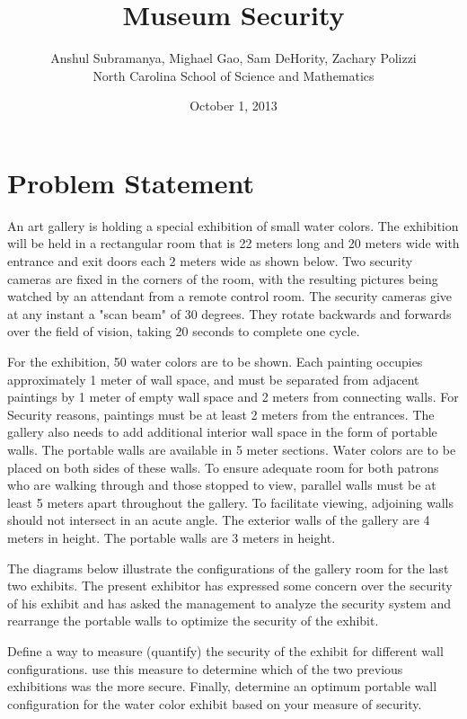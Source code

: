 \documentclass{article}
\title{Museum Security}
\author{Anshul Subramanya, Mighael Gao, Sam DeHority, Zachary Polizzi \\
North Carolina School of Science and Mathematics}
\date{October 1, 2013 }
\begin{document}
   \maketitle
   \begin{center}
      \end{center}
   \newpage
	   
	
	\tableofcontents

\newpage

	\section{Problem Statement}
	
	An art gallery is holding a special exhibition of small water colors. The exhibition will be held in a rectangular room that is 22 meters long and 20 meters wide with entrance and exit doors each 2 meters wide as shown below. Two security cameras are fixed in the corners of the room, with the resulting pictures being watched by an attendant from a remote control room. The security cameras give at any instant a "scan beam" of 30 degrees. They rotate backwards and forwards over the field of vision, taking 20 seconds to complete one cycle. 
	
	For the exhibition, 50 water colors are to be shown. Each painting occupies approximately 1 meter of wall space, and must be separated from adjacent paintings by 1 meter of empty wall space and 2 meters from connecting walls. For Security reasons, paintings must be at least 2 meters from the entrances. The gallery also needs to add additional interior wall space in the form of portable walls. The portable walls are available in 5 meter sections. Water colors are to be placed on both sides of these walls. To ensure adequate room for both patrons who are walking through and those stopped to view, parallel walls must be at least 5 meters apart throughout the gallery. To facilitate viewing, adjoining walls should not intersect in an acute angle. The exterior walls of the gallery are 4 meters in height. The portable walls are 3 meters in height. 
	
	The diagrams below illustrate the configurations of the gallery room for the last two exhibits. The present exhibitor has expressed some concern over the security of his exhibit and has asked the management to analyze the security system and rearrange the portable walls to optimize the security of the exhibit. 
	
	Define a way to measure (quantify) the security of the exhibit for different wall configurations. use this measure to determine which of the two previous exhibitions was the more secure. Finally, determine an optimum portable wall configuration for the water color exhibit based on your measure of security. 
	
\end{document}

